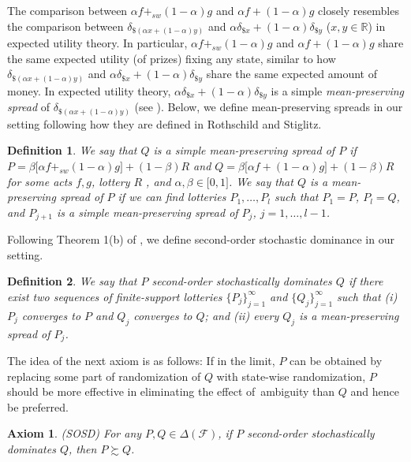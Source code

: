 \documentclass[12pt, notitlepage]{article}
\newtheorem{axiom}{Axiom}
\newtheorem{definition}{Definition}
\begin{document}
The comparison between $\alpha f+_{sw}(1-\alpha )g$ and $\alpha f+(1-\alpha
)g$ closely resembles the comparison between $\delta _{\$(\alpha x+(1-\alpha
)y)}$ and $\alpha \delta _{\$x}+(1-\alpha )\delta _{\$y}$ ($x,y\in \mathbb{R}
$) in expected utility theory. In particular, $\alpha f+_{sw}(1-\alpha )g$
and $\alpha f+(1-\alpha )g$ share the same expected utility (of prizes)
fixing any state, similar to how $\delta _{\$(\alpha x+(1-\alpha )y)}$ and $%
\alpha \delta _{\$x}+(1-\alpha )\delta _{\$y}$ share the same expected
amount of money. In expected utility theory, $\alpha \delta _{\$x}+(1-\alpha
)\delta _{\$y}$ is a simple \textit{mean-preserving spread} of $\delta
_{\$(\alpha x+(1-\alpha )y)}$ (see \cite{RothschildStiglitz70}). Below, we
define mean-preserving spreads in our setting following how they are defined
in Rothschild and Stiglitz.

\begin{definition}
We say that $Q$ \textit{is a simple mean-preserving spread of} $P$ if $%
P=\beta \lbrack \alpha f+_{sw}(1-\alpha )g]+(1-\beta )R$ and $Q=\beta
\lbrack \alpha f+(1-\alpha )g]+(1-\beta )R$ for some acts $f,g$, lottery $R$%
, and $\alpha ,\beta \in \lbrack 0,1]$. We say that $Q$ is a mean-preserving
spread of $P$ if we can find lotteries $P_{1},\dots ,P_{l}$ such that $%
P_{1}=P$, $P_{l}=Q$, and $P_{j+1}$ is a simple mean-preserving spread of $%
P_{j}$, $j=1,\dots ,l-1$.
\end{definition}

Following Theorem 1(b) of \cite{RothschildStiglitz70}, we define
second-order stochastic dominance in our setting.

\begin{definition}
We say that $P$ \textit{second-order stochastically dominates} $Q$ if there
exist two sequences of finite-support lotteries $\{P_{j}\}_{j=1}^{\infty }$
and $\{Q_{j}\}_{j=1}^{\infty }$ such that (\textrm{i}) $P_{j}$ converges to $%
P$ and $Q_{j}$ converges to $Q$; and (\textrm{ii}) every $Q_{j}$ is a
mean-preserving spread of $P_{j}$.
\end{definition}

The idea of the next axiom is as follows: If in the limit, $P$ can be
obtained by replacing some part of randomization of $Q$ with state-wise
randomization, $P$ should be more effective in eliminating the effect of\
ambiguity than $Q$ and hence be preferred.

\begin{axiom}
(SOSD) For any $P,Q\in \Delta (\mathcal{F})$, if $P$ second-order
stochastically dominates $Q$, then $P\succsim Q$.
\end{axiom}
\end{document}
